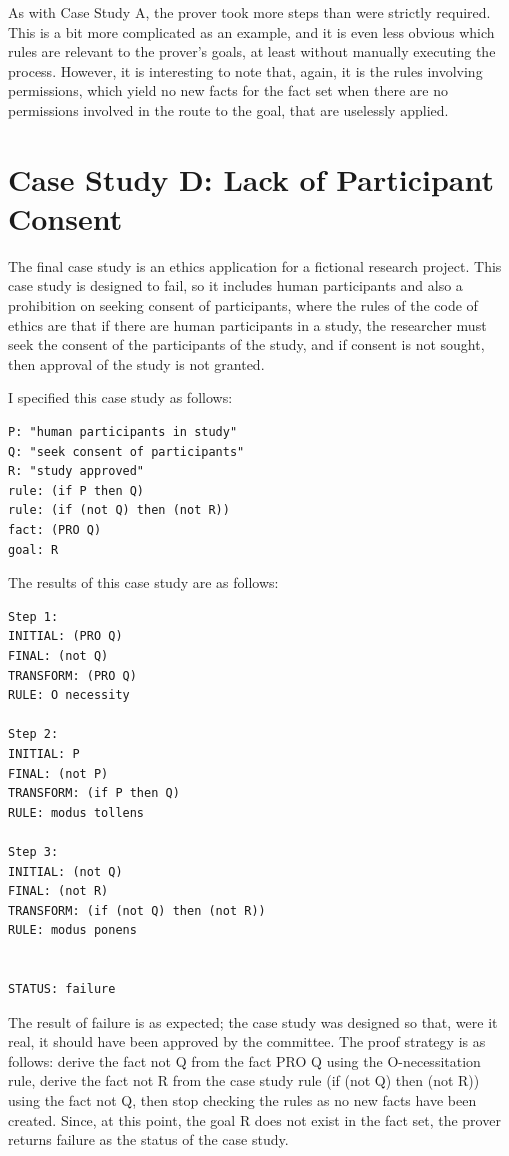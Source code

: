 \documentclass{l4proj}
\begin{document}
As with Case Study A, the prover took more steps than were strictly required. This is a bit more complicated as an example, and it is even less obvious which rules are relevant to the prover's goals, at least without manually executing the process. However, it is interesting to note that, again, it is the rules involving permissions, which yield no new facts for the fact set when there are no permissions involved in the route to the goal, that are uselessly applied. 

\section{Case Study D: Lack of Participant Consent}
The final case study is an ethics application for a fictional research project. This case study is designed to fail, so it includes human participants and also a prohibition on seeking consent of participants, where the rules of the code of ethics are that if there are human participants in a study, the researcher must seek the consent of the participants of the study, and if consent is not sought, then approval of the study is not granted. 

I specified this case study as follows: 
\begin{verbatim}
P: "human participants in study" 
Q: "seek consent of participants"
R: "study approved"
rule: (if P then Q)
rule: (if (not Q) then (not R))
fact: (PRO Q)
goal: R
\end{verbatim}

The results of this case study are as follows: 
\begin{verbatim}
Step 1: 
INITIAL: (PRO Q)
FINAL: (not Q)
TRANSFORM: (PRO Q)
RULE: O necessity

Step 2: 
INITIAL: P
FINAL: (not P)
TRANSFORM: (if P then Q)
RULE: modus tollens

Step 3: 
INITIAL: (not Q)
FINAL: (not R)
TRANSFORM: (if (not Q) then (not R))
RULE: modus ponens


STATUS: failure
\end{verbatim}
The result of failure is as expected; the case study was designed so that, were it real, it should have been approved by the committee. The proof strategy is as follows: derive the fact not Q from the fact PRO Q using the O-necessitation rule, derive the fact not R from the case study rule (if (not Q) then (not R)) using the fact not Q, then stop checking the rules as no new facts have been created. Since, at this point, the goal R does not exist in the fact set, the prover returns failure as the status of the case study. 
\end{document}
